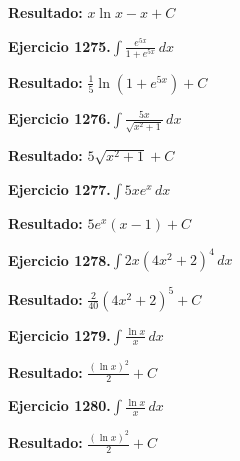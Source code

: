 \documentclass[10pt,a4paper]{article}
\begin{document}
\begin{solbox}
\textbf{Resultado:} \(\displaystyle x\ln x - x + C\)
\end{solbox}

\begin{ejbox}
\textbf{Ejercicio 1275.}\quad $\int \frac{e^{5x}}{1+e^{5x}}\,dx$
\end{ejbox}

\begin{solbox}
\textbf{Resultado:} \(\displaystyle \frac{1}{5}\ln(1+e^{5x}) + C\)
\end{solbox}

\newpage
\begin{ejbox}
\textbf{Ejercicio 1276.}\quad $\int \frac{5x}{\sqrt{x^2+1}}\,dx$
\end{ejbox}

\begin{solbox}
\textbf{Resultado:} \(\displaystyle 5\sqrt{x^2+1} + C\)
\end{solbox}

\begin{ejbox}
\textbf{Ejercicio 1277.}\quad $\int 5x e^{x}\,dx$
\end{ejbox}

\begin{solbox}
\textbf{Resultado:} \(\displaystyle 5e^x(x-1) + C\)
\end{solbox}

\begin{ejbox}
\textbf{Ejercicio 1278.}\quad $\int 2x(4x^2 + 2)^{4}\,dx$
\end{ejbox}

\begin{solbox}
\textbf{Resultado:} \(\displaystyle \frac{2}{40}(4x^2+2)^{5} + C\)
\end{solbox}

\newpage
\begin{ejbox}
\textbf{Ejercicio 1279.}\quad $\int \frac{\ln x}{x}\,dx$
\end{ejbox}

\begin{solbox}
\textbf{Resultado:} \(\displaystyle \frac{(\ln x)^2}{2} + C\)
\end{solbox}

\begin{ejbox}
\textbf{Ejercicio 1280.}\quad $\int \frac{\ln x}{x}\,dx$
\end{ejbox}

\begin{solbox}
\textbf{Resultado:} \(\displaystyle \frac{(\ln x)^2}{2} + C\)
\end{solbox}
\end{document}
